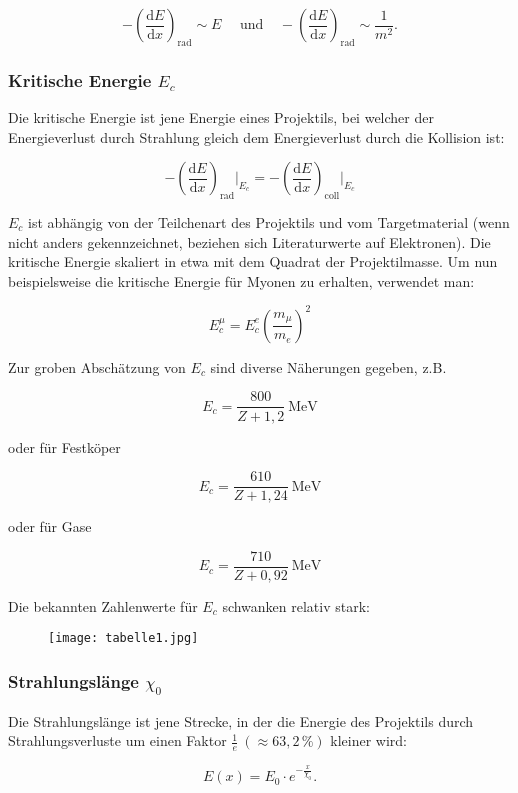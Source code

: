 \[-\left(\frac{\mathrm{d}E}{\mathrm{d}x}\right)_{\text{rad}} \sim E~~~~~~\text{und}~~~~~
-\left(\frac{\mathrm{d}E}{\mathrm{d}x}\right)_{\text{rad}} \sim \frac{1}{m^2}.\]

\subsubsection*{Kritische Energie $E_c$}

Die kritische Energie ist jene Energie eines Projektils, bei welcher der Energieverlust durch
Strahlung gleich dem Energieverlust durch die Kollision ist:

\[-\left(\frac{\mathrm{d}E}{\mathrm{d}x}\right)_{\text{rad}} \bigg|_{E_c} = -\left(\frac{\mathrm{d}E}{\mathrm{d}x}\right)_{\text{coll}}
\bigg|_{E_c}  \]

$E_c$ ist abhängig von der Teilchenart des Projektils und vom Targetmaterial (wenn nicht anders
gekennzeichnet, beziehen sich Literaturwerte auf Elektronen). Die kritische Energie skaliert in etwa
mit dem Quadrat der Projektilmasse. Um nun beispielsweise die kritische Energie für Myonen zu
erhalten, verwendet man:

\[E_c^\mu = E_c^e \left( \frac{m_\mu}{m_e} \right)^2 \]

Zur groben Abschätzung von $E_c$ sind diverse Näherungen gegeben, z.B.

\[E_c = \frac{800}{Z+1{,}2}~\text{MeV} \]

oder für Festköper

\[E_c = \frac{610}{Z+1{,}24}~\text{MeV} \]

oder für Gase

\[E_c = \frac{710}{Z+0{,}92}~\text{MeV} \]


Die bekannten Zahlenwerte für $E_c$ schwanken relativ stark:

\begin{figure}[H]
	\centering
	\texttt{[image: tabelle1.jpg]}
\end{figure}

\subsubsection*{Strahlungslänge $\chi_0$}

Die Strahlungslänge ist jene Strecke, in der die Energie des Projektils durch Strahlungsverluste um
einen Faktor $\frac{1}{e}~(\approx63{,}2\,\%)$ kleiner wird:

\[E(x)=E_0\cdot e^{-\frac{x}{\chi_0}}.\]

